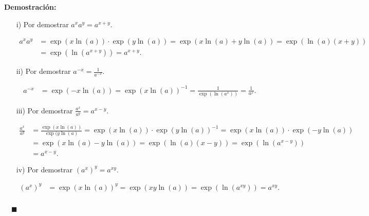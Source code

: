 \documentclass{article}
\numberwithin{equation}{section}
\newcommand{\Col}{\color{ProcessBlue}}
\newenvironment
{proof}
{\par\medskip\noindent\textbf{Demostración:}\rmfamily}
{\Col\hfill$\quad \blacksquare$\vspace{0.5cm}}
\begin{document}
\begin{proof}
    \begin{enumerate}
        \item[i)] Por demostrar $a^xa^y=a^{x+y}$.
        
        \begin{equation*}
        \begin{split}
            a^xa^y & =\exp(x\ln(a))\cdot\exp(y\ln(a))=\exp(x\ln(a)+y\ln(a))=\exp(\ln(a)(x+y))\\
            & =\exp(\ln(a^{x+y}))=a^{x+y}.
        \end{split}
        \end{equation*}
        
        \item[ii)] Por demostrar  $a^{-x}=\frac{1}{a^{-x}}$.
        
        \begin{equation*}
        \begin{split}
            a^{-x} & =\exp(-x\ln(a))=\exp(x\ln(a))^{-1}=\frac{1}{\exp(\ln(a^x))}=\frac{1}{a^x}.
        \end{split}
        \end{equation*}
        
        \item[iii)] Por demostrar $\frac{a^x}{a^y}=a^{x-y}$.
        
        \begin{equation*}
        \begin{split}
            \frac{a^x}{a^y} & =\frac{\exp(x\ln(a))}{\exp(y\ln(a)}=\exp(x\ln(a))\cdot\exp(y\ln(a))^{-1}=\exp(x\ln(a))\cdot\exp(-y\ln(a)) \\
            & =\exp(x\ln(a)-y\ln(a))=\exp(\ln(a)(x-y))=\exp(\ln(a^{x-y})) \\
            & =a^{x-y}.
        \end{split}
        \end{equation*}
        
        \item[iv)] Por demostrar $\left(a^x\right)^y=a^{xy}$.
        
        \begin{equation*}
        \begin{split}
            \left( a^x \right)^y &=\exp(x\ln(a))^y=\exp(xy\ln(a))=\exp(\ln(a^{xy}))=a^{xy}.  \\
        \end{split}
        \end{equation*}
        
        \end{enumerate}
\end{proof}
\end{document}
